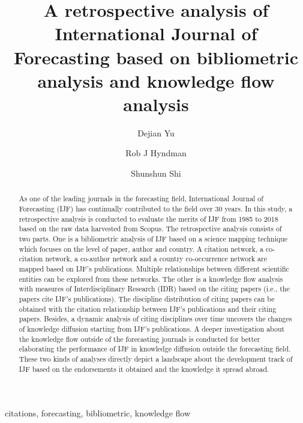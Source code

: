\documentclass[11pt,a4paper]{elsarticle} %
\begin{document}
\begin{frontmatter}

  \title{A retrospective analysis of International Journal of Forecasting based
on bibliometric analysis and knowledge flow analysis}
    \author[nau]{Dejian Yu}
  
    \author[monash]{Rob J Hyndman}
  
    \author[zufe]{Shunshun Shi}
      \address[nau]{Business School, Nanjing Audit University, Nanjing 211815, China}
    \address[monash]{Department of Econometrics \& Business Statistics, Clayton, VIC 3800,
Australia}
    \address[zufe]{Information School, Zhejiang University of Finance and Economics,
Hangzhou 310016, China}
  
  \begin{abstract}
  As one of the leading journals in the forecasting field, International
  Journal of Forecasting (IJF) has continually contributed to the field
  over 30 years. In this study, a retrospective analysis is conducted to
  evaluate the merits of IJF from 1985 to 2018 based on the raw data
  harvested from Scopus. The retrospective analysis consists of two parts.
  One is a bibliometric analysis of IJF based on a science mapping
  technique which focuses on the level of paper, author and country. A
  citation network, a co-citation network, a co-author network and a
  country co-occurrence network are mapped based on IJF's publications.
  Multiple relationships between different scientific entities can be
  explored from these networks. The other is a knowledge flow analysis
  with measures of Interdisciplinary Research (IDR) based on the citing
  papers (i.e., the papers cite IJF's publications). The discipline
  distribution of citing papers can be obtained with the citation
  relationship between IJF's publications and their citing papers.
  Besides, a dynamic analysis of citing disciplines over time uncovers the
  changes of knowledge diffusion starting from IJF's publications. A
  deeper investigation about the knowledge flow outside of the forecasting
  journals is conducted for better elaborating the performance of IJF in
  knowledge diffusion outside the forecasting field. These two kinds of
  analyses directly depict a landscape about the development track of IJF
  based on the endorsements it obtained and the knowledge it spread
  abroad.
  \end{abstract}
   \begin{keyword} citations, forecasting, bibliometric, knowledge flow\end{keyword}
 \end{frontmatter}
\end{document}
